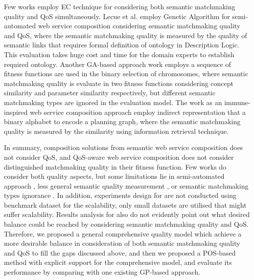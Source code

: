 \documentclass{llncs}
\begin{document}
Few works \cite{lecue2009optimizing,fanjiang2014semantic,pop2009immune} employ EC technique for considering both semantic matchmaking quality and QoS simultaneously. Lecue et al. \cite{lecue2009optimizing} employ Genetic Algorithm for semi-automated web service composition considering semantic matchmaking quality and QoS, where the semantic matchmaking quality is measured by the quality of semantic links that requires formal definition of ontology in Description Logic. This evaluation takes huge cost and time for the domain experts to establish required ontology. Another GA-based approach work \cite{fanjiang2014semantic} employs a sequence of fitness functions are used in the binary selection of chromosomes, where semantic matchmaking quality is evaluate in two fitness functions considering concept similarity and parameter similarity respectively, but different semantic matchmaking types are ignored in the evaluation model. The work \cite{pop2009immune} as an immune-inspired web service composition approach employ indirect representation that a binary alphabet to encode a planning graph, where the semantic matchmaking quality is measured  by the similarity using information retrieval technique.


In summary, composition solutions from semantic web service composition \cite{bansal2016generalized,boustil2014semantic,mier2015integrated} does not consider QoS, and QoS-aware web service composition
\cite{gupta2015optimization,ma2015hybrid,da2016particle,da2015graphevol,yu2013adaptive} does not consider distinguished matchmaking quality in their fitness function. Few works do consider both quality aspects, but some limitations lie in semi-automated approach \cite{lecue2009optimizing}, less general semantic quality measurement \cite{lecue2009optimizing,pop2009immune}, or semantic matchmaking types ignorance \cite{pop2009immune}. In addition, experiments design for  \cite{fanjiang2014semantic,lecue2009optimizing,pop2009immune} are not conducted using benchmark dataset for the scalability, only small datasets are utilised that might suffer scalability. Results analysis for \cite{lecue2009optimizing,fanjiang2014semantic,pop2009immune} also do not evidently point out what desired balance could be reached by considering semantic matchmaking quality and QoS. Therefore, we proposed a general comprehensive quality model which achieve a more desirable balance in consideration of both semantic matchmaking quality and QoS to fill the gaps discussed above, and then we proposed a POS-based method with explicit support for the comprehensive model, and evaluate its performance by comparing with one existing GP-based approach.
\end{document}
